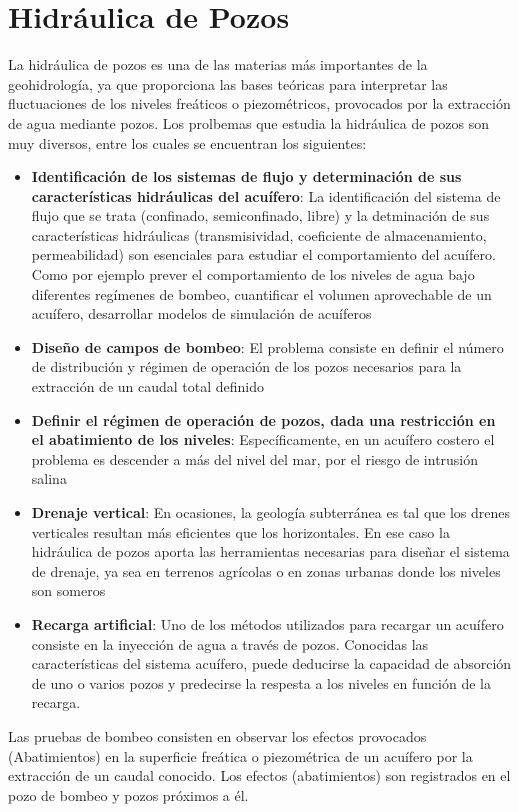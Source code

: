 \section{Hidráulica de Pozos}
La hidráulica de pozos es una de las materias más importantes de la geohidrología, ya que proporciona las bases teóricas para interpretar las fluctuaciones de los niveles freáticos o piezométricos, provocados por la extracción de agua mediante pozos. Los prolbemas que estudia la hidráulica de pozos son muy diversos, entre los cuales se encuentran los siguientes:
\begin{itemize}
    \item \textbf{Identificación de los sistemas de flujo y determinación de sus características hidráulicas del acuífero}: La identificación del sistema de flujo que se trata (confinado, semiconfinado, libre) y la detminación de sus características hidráulicas (transmisividad, coeficiente de almacenamiento, permeabilidad) son esenciales para estudiar el comportamiento del acuífero. Como por ejemplo prever el comportamiento de los niveles de agua bajo diferentes regímenes de bombeo, cuantificar el volumen aprovechable de un acuífero, desarrollar modelos de simulación de acuíferos
    \item \textbf{Diseño de campos de bombeo}: El problema consiste en definir el número de distribución y régimen de operación de los pozos necesarios para la extracción de un caudal total definido
    \item \textbf{Definir el régimen de operación de pozos, dada una restricción en el abatimiento de los niveles}: Específicamente, en un acuífero costero el problema es descender a más del nivel del mar, por el riesgo de intrusión salina
    \item \textbf{Drenaje vertical}: En ocasiones, la geología subterránea es tal que los drenes verticales resultan más eficientes que los horizontales. En ese caso la hidráulica de pozos aporta las herramientas necesarias para diseñar el sistema de drenaje, ya sea en terrenos agrícolas o en zonas urbanas donde los niveles son someros
    \item \textbf{Recarga artificial}: Uno de los métodos utilizados para recargar un acuífero consiste en la inyección de agua a través de pozos. Conocidas las características del sistema acuífero, puede deducirse la capacidad de absorción de uno o varios pozos y predecirse la respesta a los niveles en función de la recarga.
\end{itemize}
Las pruebas de bombeo consisten en observar los efectos provocados (Abatimientos) en la superficie freática o piezométrica de un acuífero por la extracción de un caudal conocido. Los efectos (abatimientos) son registrados en el pozo de bombeo y pozos próximos a él.

